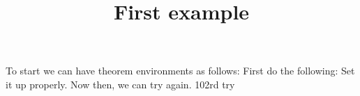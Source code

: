 \documentclass{ximera}
\title{First example}
\begin{document}
\maketitle

To start we can have theorem environments as follows:
First do the following:
Set it up properly.
Now then, we can try again.
102rd try
\end{document}
